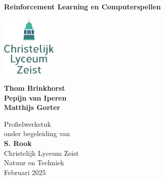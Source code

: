 \documentclass[a4paper,12pt]{article}
\begin{document}
\begin{titlepage}

    \centering
    \vspace*{2cm}
    
    \Huge
    \textbf{Reinforcement Learning en Computerspellen}
    
    \vspace{1.5cm}
    
    \includegraphics[width=0.2\textwidth]{logo-clz.png} %
    
    \vspace{2cm}
    
    \large
    \textbf{Thom Brinkhorst} \\
    \textbf{Pepijn van Iperen} \\
    \textbf{Matthijs Gorter}
    
    \vspace{1.5cm}
    
    \large
    Profielwerkstuk \\ 
    onder begeleiding van \\
    \textbf{S. Rook} \\
    Christelijk Lyceum Zeist \\
    Natuur en Techniek \\
    Februari 2025 \\
    
    \vfill
    
\end{titlepage}
\end{document}
